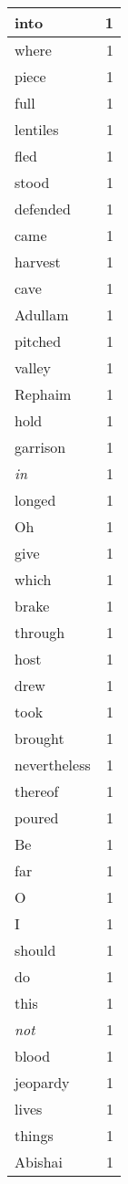 \begin{center}
\begin{longtable}{l|r}
into & 1 \\ \hline
where & 1 \\ \hline
piece & 1 \\ \hline
full & 1 \\ \hline
lentiles & 1 \\ \hline
fled & 1 \\ \hline
stood & 1 \\ \hline
defended & 1 \\ \hline
came & 1 \\ \hline
harvest & 1 \\ \hline
cave & 1 \\ \hline
Adullam & 1 \\ \hline
pitched & 1 \\ \hline
valley & 1 \\ \hline
Rephaim & 1 \\ \hline
hold & 1 \\ \hline
garrison & 1 \\ \hline
\emph{in} & 1 \\ \hline
longed & 1 \\ \hline
Oh & 1 \\ \hline
give & 1 \\ \hline
which & 1 \\ \hline
brake & 1 \\ \hline
through & 1 \\ \hline
host & 1 \\ \hline
drew & 1 \\ \hline
took & 1 \\ \hline
brought & 1 \\ \hline
nevertheless & 1 \\ \hline
thereof & 1 \\ \hline
poured & 1 \\ \hline
Be & 1 \\ \hline
far & 1 \\ \hline
O & 1 \\ \hline
I & 1 \\ \hline
should & 1 \\ \hline
do & 1 \\ \hline
this & 1 \\ \hline
\emph{not} & 1 \\ \hline
blood & 1 \\ \hline
jeopardy & 1 \\ \hline
lives & 1 \\ \hline
things & 1 \\ \hline
Abishai & 1 \\ \hline

\end{longtable}
\end{center}
